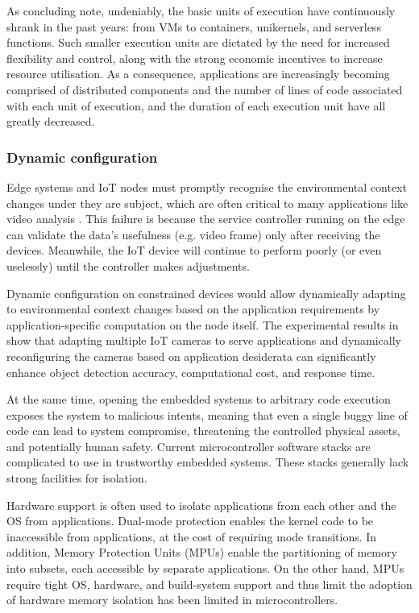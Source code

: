 \documentclass{ieeeaccess}
\begin{document}
As concluding note, undeniably, the basic units of execution have continuously shrank in the past years: from VMs to containers, unikernels, and serverless functions. Such smaller execution units are dictated by the need for increased flexibility and control, along with the strong economic incentives to increase resource utilisation. As a consequence, applications are increasingly becoming comprised of distributed components and the number of lines of code associated with each unit of execution, and the duration of each execution unit have all greatly decreased.

\subsubsection{Dynamic configuration}

Edge systems and IoT nodes must promptly recognise the environmental context changes under they are subject, which are often critical to many applications like video analysis \cite{camera-virtualisation}. This failure is because the service controller running on the edge can validate the data's usefulness (e.g. video frame) only after receiving the devices. Meanwhile, the IoT device will continue to perform poorly (or even uselessly) until the controller makes adjustments.

Dynamic configuration on constrained devices would allow dynamically adapting to environmental context changes based on the application requirements by application-specific computation on the node itself. The experimental results in \cite{camera-virtualisation} show that adapting multiple IoT cameras to serve applications and dynamically reconfiguring the cameras based on application desiderata can significantly enhance object detection accuracy, computational cost, and response time.

At the same time, opening the embedded systems to arbitrary code execution exposes the system to malicious intents, meaning that even a single buggy line of code can lead to system compromise, threatening the controlled physical assets, and potentially human safety. Current microcontroller software stacks are complicated to use in trustworthy embedded systems. These stacks generally lack strong facilities for isolation.

Hardware support is often used to isolate applications from each other and the OS from applications. Dual-mode protection enables the kernel code to be inaccessible from applications, at the cost of requiring mode transitions. In addition, Memory Protection Units (MPUs) enable the partitioning of memory into subsets, each accessible by separate applications. 
On the other hand, MPUs require tight OS, hardware, and build-system support and thus limit the adoption of hardware memory isolation has been limited in microcontrollers.
\end{document}
